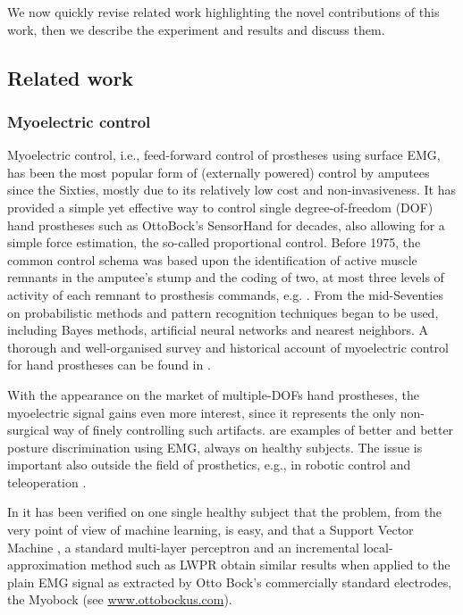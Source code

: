 We now quickly revise related work highlighting the novel contributions of this
work, then we describe the experiment and results and discuss them.

\subsection{Related work}

\subsubsection{Myoelectric control}

Myoelectric control, i.e., feed-forward control of prostheses using surface EMG,
has been the most popular form of (externally powered) control by amputees since
the Sixties, mostly due to its relatively low cost and non-invasiveness. It has
provided a simple yet effective way to control single degree-of-freedom (DOF) hand
prostheses such as OttoBock's SensorHand for decades, also allowing for a simple
force estimation, the so-called proportional control. Before 1975, the common
control schema was based upon the identification of active muscle remnants in the
amputee's stump and the coding of two, at most three levels of activity of each
remnant to prosthesis commands, e.g. \cite{bottomley65,childress69}. From the mid-Seventies
on probabilistic methods and pattern recognition techniques began to be used,
including Bayes methods, artificial neural networks and nearest neighbors. 
A thorough and well-organised survey and historical account of myoelectric
control for hand prostheses can be found in \cite{englehart06}.

With the appearance on the market of multiple-DOFs hand prostheses, the myoelectric
signal gains even more interest, since it represents the only non-surgical
way of finely controlling such artifacts. \cite{englehart01,dunlop,smagt06} are
examples of better and better posture discrimination using EMG, always on healthy
subjects. The issue is important also outside the field of prosthetics, e.g., in
robotic control and teleoperation \cite{fukuda,yokoi}.

In \cite{2008.ICRA,2008.BioCyb} it has been verified on one single healthy subject
that the problem, from the very point of view of machine learning,
is easy, and that a Support Vector Machine \cite{BGV92},
a standard multi-layer perceptron and an incremental local-approximation
method such as LWPR \cite{lwpr} obtain similar results when applied to the plain EMG
signal as extracted by Otto Bock's commercially standard electrodes, the Myobock
(see \url{www.ottobockus.com}).

